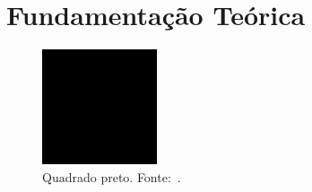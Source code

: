 \chapter{Fundamentação Teórica}%
\label{cap:fundamentacao}

\begin{figure}[!ht]%
    \centering
    \includegraphics[scale=0.5]{imagens/black-square.png}
    \caption{Quadrado preto. Fonte:~\cite{tortinhas}.}%
    \label{fig:f1}
\end{figure}

\lipsum[1-20]
